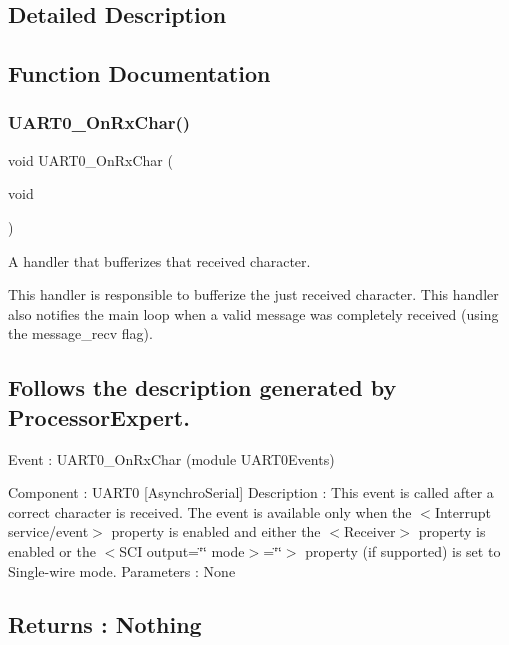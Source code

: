 \subsection{Detailed Description}


\subsection{Function Documentation}
\mbox{\label{group___u_a_r_t0_events__module_gabb812347b38dc208a03fb309a1978ed6}} 
\subsubsection{\texorpdfstring{U\+A\+R\+T0\+\_\+\+On\+Rx\+Char()}{UART0\_OnRxChar()}}
{\footnotesize\ttfamily void U\+A\+R\+T0\+\_\+\+On\+Rx\+Char (\begin{DoxyParamCaption}\item[{void}]{ }\end{DoxyParamCaption})}



A handler that bufferizes that received character. 

This handler is responsible to bufferize the just received character. This handler also notifies the main loop when a valid message was completely received (using the message\+\_\+recv flag).

\subsection*{Follows the description generated by Processor\+Expert. }

Event \+: U\+A\+R\+T0\+\_\+\+On\+Rx\+Char (module U\+A\+R\+T0\+Events)

Component \+: U\+A\+R\+T0 \mbox{[}Asynchro\+Serial\mbox{]} Description \+: This event is called after a correct character is received. The event is available only when the $<$Interrupt service/event$>$ property is enabled and either the $<$\+Receiver$>$ property is enabled or the $<$\+S\+C\+I output=\char`\"{}\char`\"{} mode$>$=\char`\"{}\char`\"{}$>$ property (if supported) is set to Single-\/wire mode. Parameters \+: None \subsection*{Returns \+: Nothing }\mbox{\label{group___u_a_r_t0_events__module_ga96b3fd9eb4bbaf0ad2eb012cd3738ed0}} 

